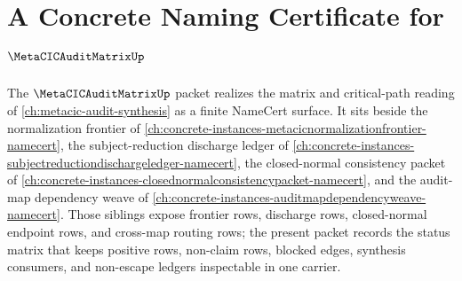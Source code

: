 \chapter{A Concrete Naming Certificate for $\MetaCICAuditMatrixUp$}
\label{ch:concrete-instances-metacic-audit-matrix-namecert}

The $\MetaCICAuditMatrixUp$ packet realizes the matrix and critical-path reading of \autoref{ch:metacic-audit-synthesis} as a finite NameCert surface. It sits beside the normalization frontier of \autoref{ch:concrete-instances-metacicnormalizationfrontier-namecert}, the subject-reduction discharge ledger of \autoref{ch:concrete-instances-subjectreductiondischargeledger-namecert}, the closed-normal consistency packet of \autoref{ch:concrete-instances-closednormalconsistencypacket-namecert}, and the audit-map dependency weave of \autoref{ch:concrete-instances-auditmapdependencyweave-namecert}. Those siblings expose frontier rows, discharge rows, closed-normal endpoint rows, and cross-map routing rows; the present packet records the status matrix that keeps positive rows, non-claim rows, blocked edges, synthesis consumers, and non-escape ledgers inspectable in one carrier.

